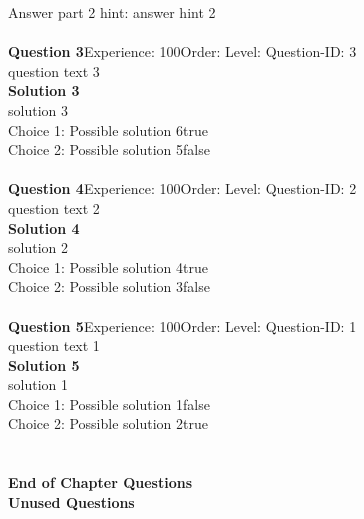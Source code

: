 \documentclass{article}
\begin{document}
Answer part 2 hint: \hspace{15pt}answer hint 2\\
\\[4pt]
\noindent\textbf{Question 3}\hspace{20pt}Experience: 100\hspace{20pt}Order: \hspace{20pt}Level: \hspace{20pt}Question-ID: 3\\[2pt]
question text 3\\[4pt]
\noindent\textbf{Solution 3}\\[2pt]
solution 3\\[4pt]
Choice 1: \hspace{20pt}Possible solution 6\hspace{20pt}true\\
Choice 2: \hspace{20pt}Possible solution 5\hspace{20pt}false\\
\\[4pt]
\noindent\textbf{Question 4}\hspace{20pt}Experience: 100\hspace{20pt}Order: \hspace{20pt}Level: \hspace{20pt}Question-ID: 2\\[2pt]
question text 2\\[4pt]
\noindent\textbf{Solution 4}\\[2pt]
solution 2\\[4pt]
Choice 1: \hspace{20pt}Possible solution 4\hspace{20pt}true\\
Choice 2: \hspace{20pt}Possible solution 3\hspace{20pt}false\\
\\[4pt]
\noindent\textbf{Question 5}\hspace{20pt}Experience: 100\hspace{20pt}Order: \hspace{20pt}Level: \hspace{20pt}Question-ID: 1\\[2pt]
question text 1\\[4pt]
\noindent\textbf{Solution 5}\\[2pt]
solution 1\\[4pt]
Choice 1: \hspace{20pt}Possible solution 1\hspace{20pt}false\\
Choice 2: \hspace{20pt}Possible solution 2\hspace{20pt}true\\
\\[4pt]
\\[2pt]
\noindent\large{\textbf{End of Chapter Questions}}\\[15pt]
\noindent\Huge{\textbf{Unused Questions}}\\[10pt]
\noindent\large{}\\
\end{document}
